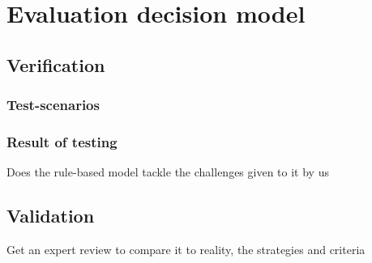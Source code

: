 \chapter{Evaluation decision model}

\section{Verification}

\subsection{Test-scenarios}

\subsection{Result of testing}
Does the rule-based model tackle the challenges given to it by us

\section{Validation}
Get an expert review to compare it to reality, the strategies and criteria

